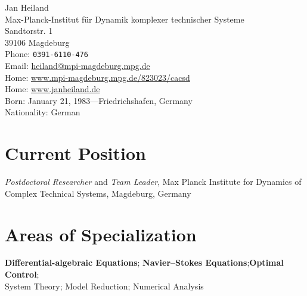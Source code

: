 \documentclass[11pt, a4paper]{article} %
\begin{document}
\sffamily

{\LARGE Jan Heiland}\\[1cm] %
Max-Planck-Institut f\"ur Dynamik komplexer technischer Systeme\\ %
Sandtorstr. 1\\
39106 Magdeburg \\[.2cm]
Phone: \texttt{0391-6110-476}\\ [.2cm]
Email: \href{mailto:heiland@mpi-magdeburg.mpg.de}{heiland@mpi-magdeburg.mpg.de}\\ %
Home: \href{http://www.mpi-magdeburg.mpg.de/823023/cacsd}{www.mpi-magdeburg.mpg.de/823023/cacsd}\\ %
Home: \href{http://www.janheiland.de}{www.janheiland.de}\\[.3in] %



Born: January 21, 1983---Friedrichshafen, Germany\\ %
Nationality: German


\section*{Current Position}

\emph{Postdoctoral Researcher} and \emph{Team Leader}, Max Planck Institute for Dynamics of Complex Technical Systems, Magdeburg, Germany %


\section*{Areas of Specialization}

\textbf{Differential-algebraic Equations}; \textbf{Navier--Stokes Equations};\textbf{Optimal Control};  \\System Theory; Model Reduction; Numerical Analysis
\end{document}
